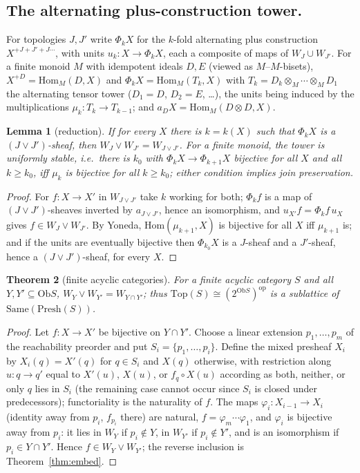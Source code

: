 \documentclass[11pt]{amsart}
\newtheorem{thm}{Theorem}[section]
\newtheorem{lem}[thm]{Lemma}
\theoremstyle{definition}
\newcommand{\Same}{\mathrm{Same}}
\newcommand{\Top}{\mathrm{Top}}
\newcommand{\Presh}{\mathrm{Presh}}
\newcommand{\Hom}{\mathrm{Hom}}
\newcommand{\Ob}{\mathrm{Ob}}
\begin{document}
\subsection{The alternating plus-construction tower.}
For topologies $J,J'$ write $\Phi_kX$ for the $k$-fold alternating plus
construction $X^{+J+J'+J\cdots}$, with units $u_k\colon X\to\Phi_kX$, each a
composite of maps of $W_J\cup W_{J'}$. For a finite monoid $M$ with idempotent
ideals $D,E$ (viewed as $M$--$M$-bisets), $X^{+D}=\Hom_M(D,X)$ and
$\Phi_kX=\Hom_M(T_k,X)$ with $T_k=D_k\otimes_M\cdots\otimes_MD_1$ the
alternating tensor tower ($D_1=D$, $D_2=E$, \dots), the units being induced by
the multiplications $\mu_k\colon T_k\to T_{k-1}$; and $a_DX=\Hom_M(D\otimes D,X)$.

\begin{lem}[reduction]\label{lem:reduction}
If for every $X$ there is $k=k(X)$ such that $\Phi_kX$ is a $(J\vee J')$-sheaf,
then $W_J\vee W_{J'}=W_{J\vee J'}$. For a finite monoid, the tower is
\emph{uniformly} stable, i.e.\ there is $k_0$ with $\Phi_kX\to\Phi_{k+1}X$
bijective for all $X$ and all $k\ge k_0$, iff $\mu_k$ is bijective for all
$k\ge k_0$; either condition implies join preservation.
\end{lem}
\begin{proof}
For $f\colon X\to X'$ in $W_{J\vee J'}$ take $k$ working for both; $\Phi_kf$ is a
map of $(J\vee J')$-sheaves inverted by $a_{J\vee J'}$, hence an isomorphism,
and $u_{X'}f=\Phi_kf\,u_X$ gives $f\in W_J\vee W_{J'}$. By Yoneda, $\Hom(\mu_{k+1},X)$
is bijective for all $X$ iff $\mu_{k+1}$ is; and if the units are eventually
bijective then $\Phi_{k_0}X$ is a $J$-sheaf and a $J'$-sheaf, hence a
$(J\vee J')$-sheaf, for every $X$.
\end{proof}

\begin{thm}[finite acyclic categories]\label{thm:acyclic}
For a finite acyclic category $S$ and all $Y,Y'\subseteq\Ob S$,
$W_Y\vee W_{Y'}=W_{Y\cap Y'}$; thus $\Top(S)\cong(2^{\Ob S})^{\mathrm{op}}$ is a
sublattice of $\Same(\Presh(S))$.
\end{thm}
\begin{proof}
Let $f\colon X\to X'$ be bijective on $Y\cap Y'$. Choose a linear extension
$p_1,\dots,p_m$ of the reachability preorder and put $S_i=\{p_1,\dots,p_i\}$.
Define the mixed presheaf $X_i$ by $X_i(q)=X'(q)$ for $q\in S_i$ and $X(q)$
otherwise, with restriction along $u\colon q\to q'$ equal to $X'(u)$, $X(u)$, or
$f_q\circ X(u)$ according as both, neither, or only $q$ lies in $S_i$ (the
remaining case cannot occur since $S_i$ is closed under predecessors);
functoriality is the naturality of $f$. The maps $\varphi_i\colon X_{i-1}\to X_i$
(identity away from $p_i$, $f_{p_i}$ there) are natural,
$f=\varphi_m\cdots\varphi_1$, and $\varphi_i$ is bijective away from $p_i$: it
lies in $W_Y$ if $p_i\notin Y$, in $W_{Y'}$ if $p_i\notin Y'$, and is an
isomorphism if $p_i\in Y\cap Y'$. Hence $f\in W_Y\vee W_{Y'}$; the reverse
inclusion is Theorem~\ref{thm:embed}.
\end{proof}
\end{document}
